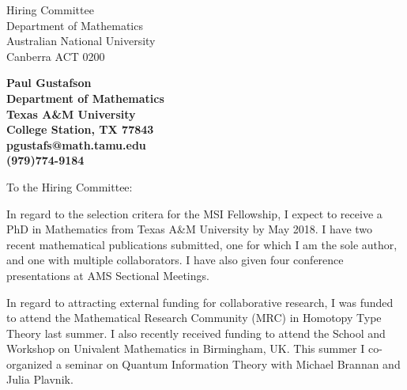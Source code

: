 \documentclass[11pt]{letter} %
\begin{document}

\begin{letter}{Hiring Committee \\
Department of Mathematics \\
Australian National University \\
Canberra ACT 0200}


\begin{center}
\large\bf Paul Gustafson \\ %
Department of Mathematics \\ Texas A\&M University \\ College Station, TX 77843 \\ pgustafs@math.tamu.edu \\ (979)774-9184 %
\end{center} 
\vfill



\opening{To the Hiring Committee:}

In regard to the selection critera for the MSI Fellowship, I expect to receive a PhD in Mathematics from Texas A\&M University by May 2018.  I have two recent mathematical publications submitted, one for which I am the sole author, and one with multiple collaborators. I have also given four conference presentations at AMS Sectional Meetings.

In regard to attracting external funding for collaborative research, I was funded to attend the Mathematical Research Community (MRC) in Homotopy Type Theory last summer.  I also recently received funding to attend the School and Workshop on Univalent Mathematics in Birmingham, UK.  This summer I co-organized a seminar on Quantum Information Theory with Michael Brannan and Julia Plavnik.


\end{letter}
\end{document}
